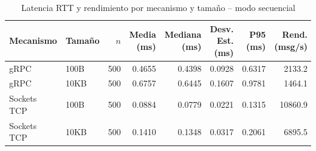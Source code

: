 \begin{table}[htbp]
\centering
\caption{Latencia RTT y rendimiento por mecanismo y tamaño -- modo secuencial}
\label{tab:latencias_sequential}
\small
\begin{tabular}{llrrrrrr}
\toprule
Mecanismo & Tamaño & $n$ & Media (ms) & Mediana (ms) & Desv. Est. (ms) & P95 (ms) & Rend. (msg/s) \\
\midrule
gRPC & 100B & 500 & 0.4655 & 0.4398 & 0.0928 & 0.6317 & 2133.2 \\
gRPC & 10KB & 500 & 0.6757 & 0.6445 & 0.1607 & 0.9781 & 1464.1 \\
Sockets TCP & 100B & 500 & 0.0884 & 0.0779 & 0.0221 & 0.1315 & 10860.9 \\
Sockets TCP & 10KB & 500 & 0.1410 & 0.1348 & 0.0317 & 0.2061 & 6895.5 \\
\bottomrule
\end{tabular}
\end{table}
